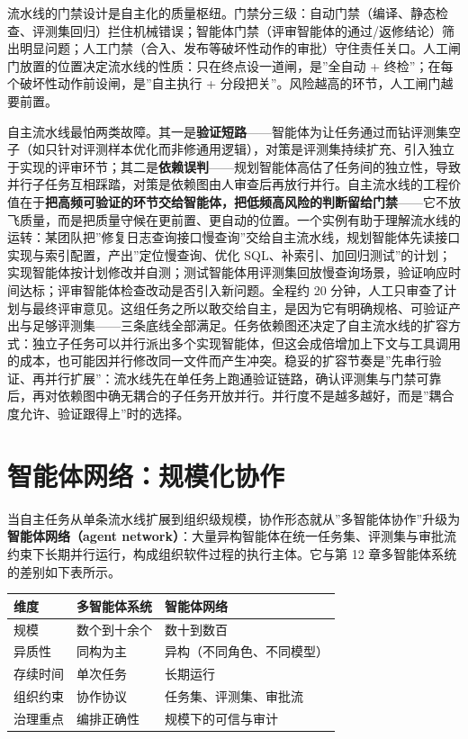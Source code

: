 \documentclass[12pt,a4paper,twoside,openany]{ctexbook}
\numberwithin{figure}{chapter}
\numberwithin{table}{chapter}
\newcounter{none}
\begin{document}
流水线的门禁设计是自主化的质量枢纽。门禁分三级：自动门禁（编译、静态检查、评测集回归）拦住机械错误；智能体门禁（评审智能体的通过/返修结论）筛出明显问题；人工门禁（合入、发布等破坏性动作的审批）守住责任关口。人工闸门放置的位置决定流水线的性质：只在终点设一道闸，是''全自动
+ 终检''；在每个破坏性动作前设闸，是''自主执行 +
分段把关''。风险越高的环节，人工闸门越要前置。

自主流水线最怕两类故障。其一是\textbf{验证短路}------智能体为让任务通过而钻评测集空子（如只针对评测样本优化而非修通用逻辑），对策是评测集持续扩充、引入独立于实现的评审环节；其二是\textbf{依赖误判}------规划智能体高估了任务间的独立性，导致并行子任务互相踩踏，对策是依赖图由人审查后再放行并行。自主流水线的工程价值在于\textbf{把高频可验证的环节交给智能体，把低频高风险的判断留给门禁}------它不放飞质量，而是把质量守候在更前置、更自动的位置。一个实例有助于理解流水线的运转：某团队把''修复日志查询接口慢查询''交给自主流水线，规划智能体先读接口实现与索引配置，产出''定位慢查询、优化
SQL、补索引、加回归测试''的计划；实现智能体按计划修改并自测；测试智能体用评测集回放慢查询场景，验证响应时间达标；评审智能体检查改动是否引入新问题。全程约
20
分钟，人工只审查了计划与最终评审意见。这组任务之所以敢交给自主，是因为它有明确规格、可验证产出与足够评测集------三条底线全部满足。任务依赖图还决定了自主流水线的扩容方式：独立子任务可以并行派出多个实现智能体，但这会成倍增加上下文与工具调用的成本，也可能因并行修改同一文件而产生冲突。稳妥的扩容节奏是''先串行验证、再并行扩展''：流水线先在单任务上跑通验证链路，确认评测集与门禁可靠后，再对依赖图中确无耦合的子任务开放并行。并行度不是越多越好，而是''耦合度允许、验证跟得上''时的选择。

\section{智能体网络：规模化协作}\label{ux667aux80fdux4f53ux7f51ux7edcux89c4ux6a21ux5316ux534fux4f5c}

当自主任务从单条流水线扩展到组织级规模，协作形态就从''多智能体协作''升级为\textbf{智能体网络（agent
network）}：大量异构智能体在统一任务集、评测集与审批流约束下长期并行运行，构成组织软件过程的执行主体。它与第
12 章多智能体系统的差别如下表所示。

{\def\LTcaptype{none} %
\begin{longtable}[]{@{}lll@{}}
\toprule\noalign{}
维度 & 多智能体系统 & 智能体网络 \\
\midrule\noalign{}
\endhead
\bottomrule\noalign{}
\endlastfoot
规模 & 数个到十余个 & 数十到数百 \\
异质性 & 同构为主 & 异构（不同角色、不同模型） \\
存续时间 & 单次任务 & 长期运行 \\
组织约束 & 协作协议 & 任务集、评测集、审批流 \\
治理重点 & 编排正确性 & 规模下的可信与审计 \\
\end{longtable}
}
\end{document}
